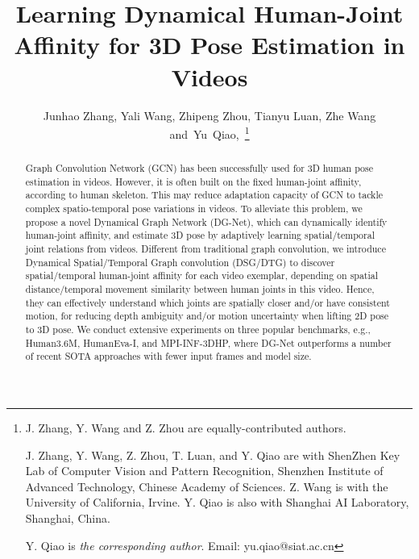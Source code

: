\documentclass[journal]{IEEEtran}
\begin{document}
	
\title{Learning Dynamical Human-Joint Affinity for 3D Pose Estimation in Videos}


\author{Junhao Zhang,
	    Yali Wang,
        Zhipeng Zhou,
        Tianyu Luan,
        Zhe Wang
        and~Yu~Qiao,~\thanks{
J. Zhang, Y. Wang and Z. Zhou are equally-contributed authors.

J. Zhang, Y. Wang, Z. Zhou, T. Luan, and Y. Qiao are with ShenZhen Key Lab of Computer Vision and Pattern Recognition, Shenzhen Institute of Advanced Technology, Chinese Academy of Sciences. Z. Wang is with the University of California, Irvine. Y. Qiao is also with Shanghai AI Laboratory, Shanghai, China.

Y. Qiao is \emph{the corresponding author}. Email: yu.qiao@siat.ac.cn
}


}




















\maketitle

\begin{abstract}
Graph Convolution Network (GCN) has been successfully used for 3D human pose estimation in videos. However,
it is often built on the fixed human-joint affinity,
according to human skeleton.
This may reduce adaptation capacity of GCN to tackle complex spatio-temporal pose variations in videos.
To alleviate this problem,
we propose a novel Dynamical Graph Network (DG-Net),
which can dynamically identify human-joint affinity,
and estimate 3D pose by adaptively learning spatial/temporal joint relations from videos. Different from traditional graph convolution,
we introduce Dynamical Spatial/Temporal Graph convolution (DSG/DTG) to discover spatial/temporal human-joint affinity for each video exemplar,
depending on spatial distance/temporal movement similarity between human joints in this video.
Hence,
they can effectively understand which joints are spatially closer and/or have consistent motion,
for reducing depth ambiguity and/or motion uncertainty when lifting 2D pose to 3D pose.
We conduct extensive experiments on three popular benchmarks,
e.g.,
Human3.6M,
HumanEva-I,
and
MPI-INF-3DHP,
where
DG-Net outperforms a number of recent SOTA approaches with fewer input frames and model size.
\end{abstract}
\end{document}
